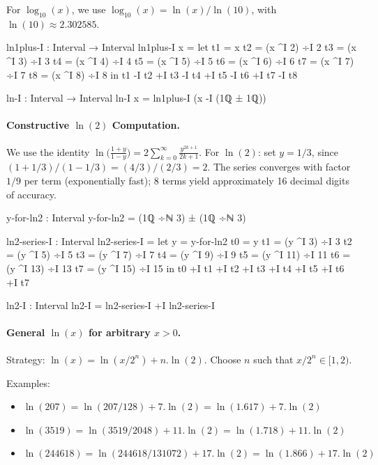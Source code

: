 \documentclass[11pt,a4paper]{book}
\def\cdot{.}%
\begin{document}
For $\log_{10}(x)$, we use $\log_{10}(x) = \ln(x) / \ln(10)$, with $\ln(10) \approx 2.302585$.

\begin{code}
ln1plus-I : Interval → Interval
ln1plus-I x = 
  let t1 = x
      t2 = (x ^I 2) ÷I 2
      t3 = (x ^I 3) ÷I 3
      t4 = (x ^I 4) ÷I 4
      t5 = (x ^I 5) ÷I 5
      t6 = (x ^I 6) ÷I 6
      t7 = (x ^I 7) ÷I 7
      t8 = (x ^I 8) ÷I 8
  in t1 -I t2 +I t3 -I t4 +I t5 -I t6 +I t7 -I t8

ln-I : Interval → Interval
ln-I x = ln1plus-I (x -I (1ℚ ± 1ℚ))

\end{code}

\paragraph{Constructive $\ln(2)$ Computation.}
We use the identity $\ln\bigl(\frac{1+y}{1-y}\bigr) = 2 \sum_{k=0}^{\infty} \frac{y^{2k+1}}{2k+1}$.
For $\ln(2)$: set $y = 1/3$, since $(1 + 1/3)/(1 - 1/3) = (4/3)/(2/3) = 2$.
The series converges with factor $1/9$ per term (exponentially fast);
8 terms yield approximately 16 decimal digits of accuracy.

\begin{code}
y-for-ln2 : Interval
y-for-ln2 = (1ℚ ÷ℕ 3) ± (1ℚ ÷ℕ 3)

ln2-series-I : Interval
ln2-series-I = 
  let y = y-for-ln2
      t0 = y
      t1 = (y ^I 3) ÷I 3
      t2 = (y ^I 5) ÷I 5
      t3 = (y ^I 7) ÷I 7
      t4 = (y ^I 9) ÷I 9
      t5 = (y ^I 11) ÷I 11
      t6 = (y ^I 13) ÷I 13
      t7 = (y ^I 15) ÷I 15
  in t0 +I t1 +I t2 +I t3 +I t4 +I t5 +I t6 +I t7

ln2-I : Interval
ln2-I = ln2-series-I +I ln2-series-I

\end{code}

\paragraph{General $\ln(x)$ for arbitrary $x > 0$.}
Strategy: $\ln(x) = \ln(x/2^n) + n \cdot \ln(2)$.
Choose $n$ such that $x/2^n \in [1, 2)$.

Examples:
\begin{itemize}
\item $\ln(207) = \ln(207/128) + 7 \cdot \ln(2) = \ln(1.617) + 7 \cdot \ln(2)$
\item $\ln(3519) = \ln(3519/2048) + 11 \cdot \ln(2) = \ln(1.718) + 11 \cdot \ln(2)$
\item $\ln(244618) = \ln(244618/131072) + 17 \cdot \ln(2) = \ln(1.866) + 17 \cdot \ln(2)$
\end{itemize}
\end{document}
